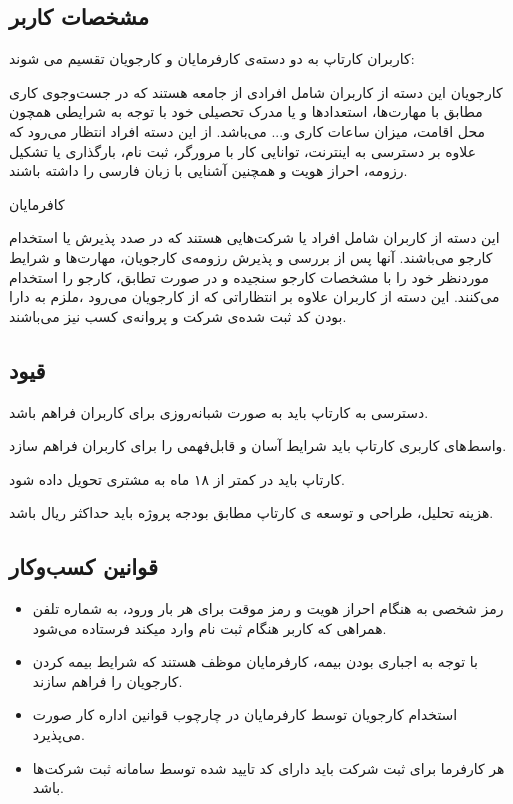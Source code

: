 \documentclass[12pt,svgnames,oneside]{book}
\newcounter{itemadded}
\let\LaTeXStandardEnumerateBegin\enumerate
\let\LaTeXStandardEnumerateEnd\endenumerate
\renewenvironment{enumerate}{%
\LaTeXStandardEnumerateBegin%
\setcounter{itemadded}{0}
}{%
\LaTeXStandardEnumerateEnd%
}%
\begin{document}
\subsection{مشخصات کاربر}
کاربران کارتاپ به دو دسته‌ی کارفرمایان و کارجویان تقسیم می شوند:

\begin{enumerate}
\item
کارجویان
این دسته از کاربران شامل افرادی از جامعه هستند که در جست‌وجوی کاری مطابق با مهارت‌ها، استعدادها و یا مدرک تحصیلی خود با توجه به شرایطی همچون محل اقامت، میزان ساعات کاری و... می‌باشد. از این دسته افراد انتظار می‌رود که علاوه بر دسترسی به اینترنت، توانایی کار با مرورگر، ثبت نام، بارگذاری یا تشکیل رزومه، احراز هویت و همچنین آشنایی با زبان فارسی را داشته باشند.
\item
کافرمایان

این دسته از کاربران شامل افراد یا شرکت‌هایی هستند که در صدد پذیرش یا استخدام کارجو می‌باشند. آنها پس از بررسی و پذیرش رزومه‌ی کارجویان، مهارت‌ها و شرایط موردنظر خود را با مشخصات کارجو سنجیده و در صورت تطابق، کارجو را استخدام می‌کنند. این دسته از کاربران علاوه بر انتظاراتی که از کارجویان می‌رود ،ملزم به دارا بودن کد ثبت شده‌ی شرکت و پروانه‌ی کسب نیز می‌باشند.
\end{enumerate}

\subsection{قیود}
\begin{enumerate}
\item
دسترسی به کارتاپ باید به صورت شبانه‌روزی برای کاربران فراهم باشد.
\item
واسط‌های کاربری کارتاپ باید شرایط آسان و قابل‌فهمی را برای کاربران فراهم سازد.
\item
کارتاپ باید در کمتر از ۱۸ ماه به مشتری تحویل داده شود.
\item
هزینه تحلیل، طراحی و توسعه ی کارتاپ مطابق بودجه پروژه باید حداکثر  ریال باشد.
\end{enumerate}
\subsection{قوانین کسب‌و‌کار}
\begin{itemize}
\item
رمز شخصی به هنگام احراز هویت و رمز موقت برای هر بار ورود، به شماره تلفن همراهی که کاربر هنگام ثبت نام وارد میکند فرستاده می‌شود.
\item
با توجه به اجباری بودن بیمه، کارفرمایان موظف هستند که شرایط بیمه کردن کارجویان را فراهم سازند.
\item
استخدام کارجویان توسط کارفرمایان در چارچوب قوانین اداره کار صورت می‌پذیرد.
\item
هر کارفرما برای ثبت شرکت باید دارای کد تایید شده توسط سامانه ثبت شرکت‌ها باشد.

\end{itemize}
\end{document}
